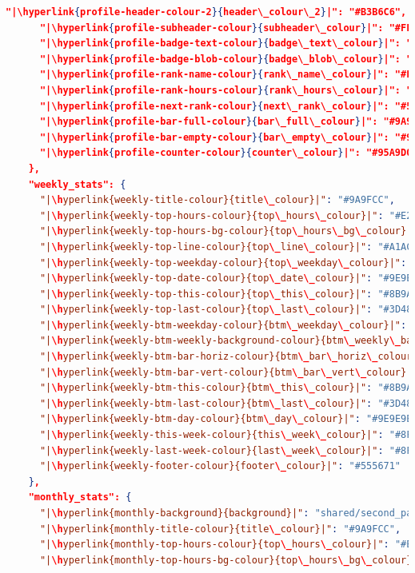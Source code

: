 \documentclass[a4paper, 10pt]{report}
\begin{document}
\begin{lstlisting}[language=json,firstnumber=1]
      "|\hyperlink{profile-header-colour-2}{header\_colour\_2}|": "#B3B6C6",
      "|\hyperlink{profile-subheader-colour}{subheader\_colour}|": "#FFFFFF",
      "|\hyperlink{profile-badge-text-colour}{badge\_text\_colour}|": "#414A9F",
      "|\hyperlink{profile-badge-blob-colour}{badge\_blob\_colour}|": "#FFFFFF",
      "|\hyperlink{profile-rank-name-colour}{rank\_name\_colour}|": "#FFFFFF",
      "|\hyperlink{profile-rank-hours-colour}{rank\_hours\_colour}|": "#53504D",
      "|\hyperlink{profile-next-rank-colour}{next\_rank\_colour}|": "#53504D",
      "|\hyperlink{profile-bar-full-colour}{bar\_full\_colour}|": "#9A9FCD",
      "|\hyperlink{profile-bar-empty-colour}{bar\_empty\_colour}|": "#9A9FCD4D",
      "|\hyperlink{profile-counter-colour}{counter\_colour}|": "#95A9D0"
    },
    "weekly_stats": {
      "|\hyperlink{weekly-title-colour}{title\_colour}|": "#9A9FCC",
      "|\hyperlink{weekly-top-hours-colour}{top\_hours\_colour}|": "#E2E2E2",
      "|\hyperlink{weekly-top-hours-bg-colour}{top\_hours\_bg\_colour}|": "#555682",
      "|\hyperlink{weekly-top-line-colour}{top\_line\_colour}|": "#A1ACCD26",
      "|\hyperlink{weekly-top-weekday-colour}{top\_weekday\_colour}|": "#9E9E9E",
      "|\hyperlink{weekly-top-date-colour}{top\_date\_colour}|": "#9E9E9E",
      "|\hyperlink{weekly-top-this-colour}{top\_this\_colour}|": "#8B9ACD",
      "|\hyperlink{weekly-top-last-colour}{top\_last\_colour}|": "#3D486F80",
      "|\hyperlink{weekly-btm-weekday-colour}{btm\_weekday\_colour}|": "#E2E2E2",
      "|\hyperlink{weekly-btm-weekly-background-colour}{btm\_weekly\_background\_colour}|": "#555682",
      "|\hyperlink{weekly-btm-bar-horiz-colour}{btm\_bar\_horiz\_colour}|": "#2C33466E",
      "|\hyperlink{weekly-btm-bar-vert-colour}{btm\_bar\_vert\_colour}|": "#2C33465F",
      "|\hyperlink{weekly-btm-this-colour}{btm\_this\_colour}|": "#8B9ACD",
      "|\hyperlink{weekly-btm-last-colour}{btm\_last\_colour}|": "#3D486F80",
      "|\hyperlink{weekly-btm-day-colour}{btm\_day\_colour}|": "#9E9E9E",
      "|\hyperlink{weekly-this-week-colour}{this\_week\_colour}|": "#8F8F8F",
      "|\hyperlink{weekly-last-week-colour}{last\_week\_colour}|": "#8F8F8F",
      "|\hyperlink{weekly-footer-colour}{footer\_colour}|": "#555671"
    },
    "monthly_stats": {
      "|\hyperlink{monthly-background}{background}|": "shared/second_page_background.png",
      "|\hyperlink{monthly-title-colour}{title\_colour}|": "#9A9FCC",
      "|\hyperlink{monthly-top-hours-colour}{top\_hours\_colour}|": "#E2E2E2",
      "|\hyperlink{monthly-top-hours-bg-colour}{top\_hours\_bg\_colour}|": "#555682",

\end{lstlisting}
\end{document}
